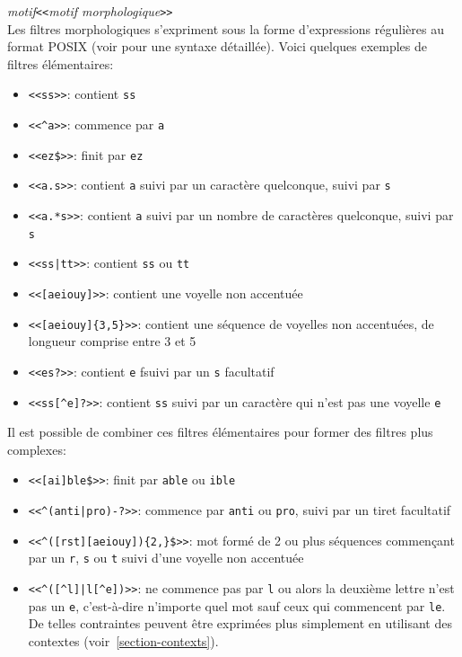 \bigskip
\noindent
\textit{motif}\verb$<<$\textit{motif morphologique}\verb$>>$ \\


\bigskip{}
\noindent Les filtres morphologiques s’expriment sous la forme d’expressions régulières au format
POSIX (voir \cite{TRE} pour une syntaxe détaillée). Voici quelques exemples de filtres élémentaires:




\begin{itemize}
  \item \verb$<<ss>>$: contient \verb$ss$
  \item \verb$<<^a>>$: commence par \verb$a$
  \item \verb+<<ez$>>+: finit par \verb$ez$
  \item \verb$<<a.s>>$: contient \verb$a$ suivi par un caractère quelconque, suivi par \verb$s$
  \item \verb$<<a.*s>>$: contient \verb$a$ suivi par un nombre de caractères quelconque, suivi par \verb$s$
  \item \verb$<<ss|tt>>$: contient \verb$ss$ ou \verb$tt$
  \item \verb$<<[aeiouy]>>$: contient une voyelle non accentuée
  \item \verb$<<[aeiouy]{3,5}>>$: contient une séquence de voyelles non accentuées, de longueur comprise entre 3 et 5
  \item \verb$<<es?>>$: contient \verb$e$ fsuivi par un \verb$s$ facultatif
  \item \verb$<<ss[^e]?>>$: contient \verb$ss$ suivi par un caractère qui n’est pas une voyelle \verb$e$
\end{itemize}

\bigskip
\noindent Il est possible de combiner ces filtres élémentaires pour former des filtres plus complexes:

\begin{itemize}
\item \verb+<<[ai]ble$>>+: finit par \verb$able$ ou \verb$ible$
\item \verb$<<^(anti|pro)-?>>$: commence par \verb$anti$ ou \verb$pro$, suivi par un tiret facultatif
  \item \verb+<<^([rst][aeiouy]){2,}$>>+: mot formé de 2 ou plus séquences commençant par un 
  	\verb$r$, \verb$s$ ou \verb$t$ suivi d’une voyelle non accentuée
  \item \verb!<<^([^l]|l[^e])>>!: ne commence pas par \verb$l$ ou alors la deuxième lettre n’est pas
un \verb$e$, c’est-à-dire n’importe quel mot sauf ceux qui commencent par \verb$le$.                                                                           De telles contraintes peuvent être exprimées plus simplement en utilisant des contextes
(voir~\ref{section-contexts}).
\end{itemize}

